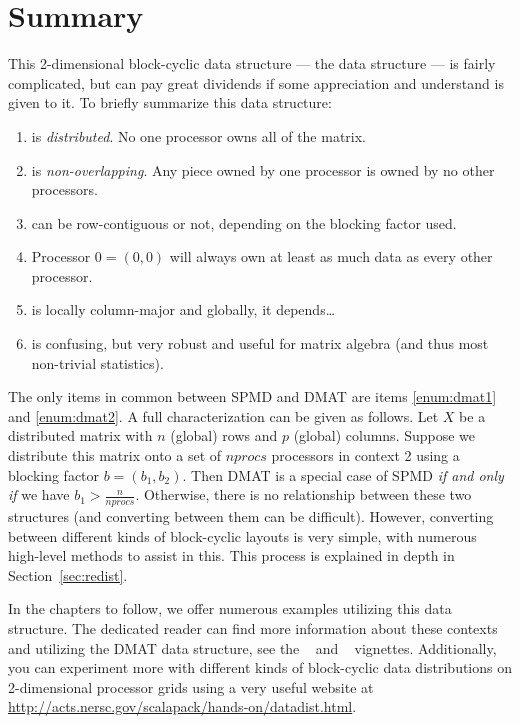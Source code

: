 \section{Summary}

This 2-dimensional block-cyclic data structure --- the  data 
structure --- is fairly complicated, but can pay great dividends if some 
appreciation and understand is given to it.  To briefly summarize this data 
structure:
\begin{enumerate}
  \item {} is \emph{distributed}.  No one processor owns all of the matrix. \label{enum:dmat1}
  \item {} is \emph{non-overlapping}. Any piece owned by one processor 
is owned by no other processors.\label{enum:dmat2} \item {} can be 
row-contiguous or not, depending on the blocking factor used.
  \item Processor $0 = (0,0)$ will always own at least as much data as every 
other processor.
  \item {} is locally column-major and globally, it depends\dots
  \item {} is confusing, but very robust and useful for matrix algebra (and thus most non-trivial statistics).
\end{enumerate}

The only items in common between SPMD and DMAT are items \ref{enum:dmat1} and 
\ref{enum:dmat2}.  A full characterization can be given as follows.  Let $X$ be 
a distributed matrix with $n$ (global) rows and $p$ (global) columns.  Suppose 
we distribute this matrix onto a set of $nprocs$ processors in context 2 using a 
blocking factor $b=(b_1, b_2)$.  Then DMAT is a special case of SPMD \emph{if 
and only if} we have $b_1 > \frac{n}{nprocs}$.  Otherwise, there is no 
relationship between these two structures (and converting between them can be 
difficult).  However, converting between different kinds of block-cyclic 
layouts is very simple, with numerous high-level methods to assist in this.  
This process is explained in depth in Section~\ref{sec:redist}.

In the chapters to follow, we offer numerous examples utilizing this data 
structure. The dedicated reader can find more information about these contexts 
and utilizing the DMAT data structure, see the 
~\citep{Schmidt2012pbdBASEvignette} and 
~\citep{Schmidt2012pbdDMATvignette} vignettes.  Additionally, you 
can experiment more with different kinds of block-cyclic data distributions on 
2-dimensional processor grids using
a very useful website at
\url{http://acts.nersc.gov/scalapack/hands-on/datadist.html}.




